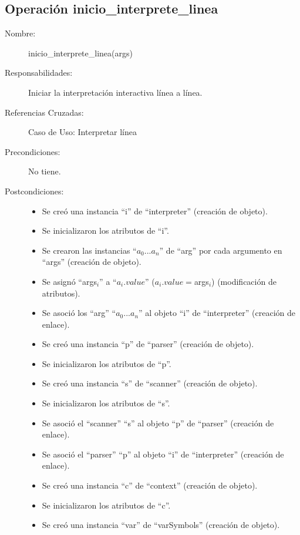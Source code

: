 \subsection{Operación inicio\_interprete\_linea}
\FloatBarrier
\begin{framed}
	\begin{description}
		\item [Nombre:] inicio\_interprete\_linea(args)
		\item [Responsabilidades:] Iniciar la interpretación interactiva línea a línea.
		\item [Referencias Cruzadas: ] Caso de Uso: Interpretar línea
      \item [Precondiciones:] No tiene.
      \item [Postcondiciones:] \hfill
      \begin {itemize}
         \item Se creó una instancia ``i'' de ``interpreter'' (creación de objeto).
         \item Se inicializaron los atributos de ``i''.
         \item Se crearon las instancias ``$a_0...a_n$'' de ``arg'' por cada argumento en ``args'' (creación de objeto).
         \item Se asignó ``args$_i$'' a ``$a_i.value$'' ($a_i.value = $args$_i$) (modificación de atributos).
         \item Se asoció los ``arg'' ``$a_0...a_n$'' al objeto ``i'' de ``interpreter'' (creación de enlace).
         \item Se creó una instancia ``p'' de ``parser'' (creación de objeto).
         \item Se inicializaron los atributos de ``p''.
         \item Se creó una instancia ``s'' de ``scanner'' (creación de objeto).
         \item Se inicializaron los atributos de ``s''.
         \item Se asoció el ``scanner'' ``s'' al objeto ``p'' de ``parser'' (creación de enlace).
         \item Se asoció el ``parser'' ``p'' al objeto ``i'' de ``interpreter'' (creación de enlace).
         \item Se creó una instancia ``c'' de ``context'' (creación de objeto).
         \item Se inicializaron los atributos de ``c''.
         \item Se creó una instancia ``var'' de ``varSymbols'' (creación de objeto).

\end{itemize}
\end{description}
\end{framed}
